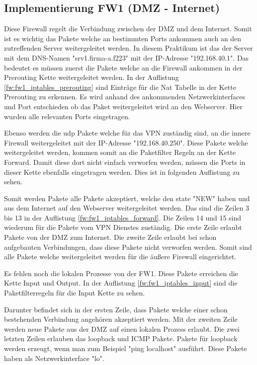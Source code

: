 \subsection{Implementierung FW1 (DMZ - Internet)}
Diese Firewall regelt die Verbindung zwischen der DMZ und dem Internet. Somit ist es wichtig das Pakete welche an bestimmten Ports ankommen auch an den zutreffenden Server weitergeleitet werden. In diesem Praktikum ist das der Server mit dem DNS-Namen "srv1.firma-a.f223" mit der IP-Adresse "192.168.40.1". Das bedeutet es müssen zuerst die Pakete welche an die Firewall ankommen in der Prerouting Kette weitergeleitet werden. In der Auflistung \ref{fw:fw1_iptables_prerouting} sind Einträge für die Nat Tabelle in der Kette Prerouting zu erkennen. Es wird anhand des ankommenden Netzwerkinterfaces und Port entschieden ob das Paket weitergeleitet wird an den Webserver. Hier wurden alle relevanten Ports eingetragen.

Ebenso werden die udp Pakete welche für das VPN zuständig sind, an die innere Firewall weitergeleitet mit der IP-Adresse "192.168.40.250". Diese Pakete welche weitergeleitet werden, kommen somit an die Paketfilter Regeln an der Kette Forward. Damit diese dort nicht einfach verworfen werden, müssen die Ports in dieser Kette ebenfalls eingetragen werden. Dies ist in folgenden Auflistung zu sehen.

Somit werden Pakete alle Pakete akzeptiert, welche den state "NEW" haben und aus dem Internet auf den Webserver weitergeleitet werden. Das sind die Zeilen 3 bis 13 in der Auflistung \ref{fw:fw1_iptables_forward}. Die Zeilen 14 und 15 sind wiederum für die Pakete vom VPN Dienstes zuständig. Die erste Zeile erlaubt Pakete von der DMZ zum Internet. Die zweite Zeile erlaubt bei schon aufgebauten Verbindungen, dass diese Pakete nicht verworfen werden. Somit sind alle Pakete welche weitergeleitet werden für die äußere Firewall eingerichtet. 

Es fehlen noch die lokalen Prozesse von der FW1. Diese Pakete erreichen die Kette Input und Output. In der Auflistung \ref{fw:fw1_iptables_input} sind die Paketfilterregeln für die Input Kette zu sehen.

Darunter befindet sich in der ersten Zeile, dass Pakete welche einer schon bestehenden Verbindung angehören akzeptiert werden. Mit der zweiten Zeile werden neue Pakete aus der DMZ auf einen lokalen Prozess erlaubt. Die zwei letzten Zeilen erlauben das loopback und ICMP Pakete. Pakete für loopback werden erzeugt, wenn man zum Beispiel "ping localhost" ausführt. Diese Pakete haben als Netzwerkinterface "lo". 


